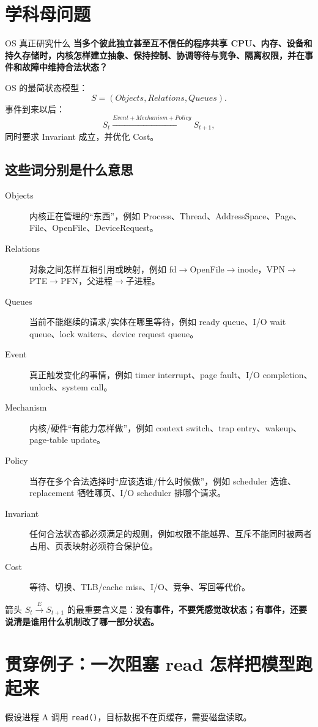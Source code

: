 \documentclass[11pt,a4paper,openany]{ctexbook}
\newcommand{\key}[1]{\textbf{\color{deep}#1}}
\begin{document}
\section{学科母问题}
\begin{corebox}{OS 真正研究什么}
\key{当多个彼此独立甚至互不信任的程序共享 CPU、内存、设备和持久存储时，内核怎样建立抽象、保持控制、协调等待与竞争、隔离权限，并在事件和故障中维持合法状态？}
\end{corebox}

OS 的最简状态模型：
\[
\boxed{S=(Objects,Relations,Queues)}.
\]
事件到来以后：
\[
S_t\xrightarrow{Event+Mechanism+Policy}S_{t+1},
\]
同时要求 Invariant 成立，并优化 Cost。

\subsection{这些词分别是什么意思}
\begin{description}
  \item[Objects] 内核正在管理的“东西”，例如 Process、Thread、AddressSpace、Page、File、OpenFile、DeviceRequest。
  \item[Relations] 对象之间怎样互相引用或映射，例如 fd$\to$OpenFile$\to$inode，VPN$\to$PTE$\to$PFN，父进程$\to$子进程。
  \item[Queues] 当前不能继续的请求/实体在哪里等待，例如 ready queue、I/O wait queue、lock waiters、device request queue。
  \item[Event] 真正触发变化的事情，例如 timer interrupt、page fault、I/O completion、unlock、system call。
  \item[Mechanism] 内核/硬件“有能力怎样做”，例如 context switch、trap entry、wakeup、page-table update。
  \item[Policy] 当存在多个合法选择时“应该选谁/什么时候做”，例如 scheduler 选谁、replacement 牺牲哪页、I/O scheduler 排哪个请求。
  \item[Invariant] 任何合法状态都必须满足的规则，例如权限不能越界、互斥不能同时被两者占用、页表映射必须符合保护位。
  \item[Cost] 等待、切换、TLB/cache miss、I/O、竞争、写回等代价。
\end{description}

箭头 $S_t\xrightarrow{E}S_{t+1}$ 的最重要含义是：\key{没有事件，不要凭感觉改状态；有事件，还要说清是谁用什么机制改了哪一部分状态。}

\section{贯穿例子：一次阻塞 read 怎样把模型跑起来}
假设进程 A 调用 \texttt{read()}，目标数据不在页缓存，需要磁盘读取。
\end{document}
